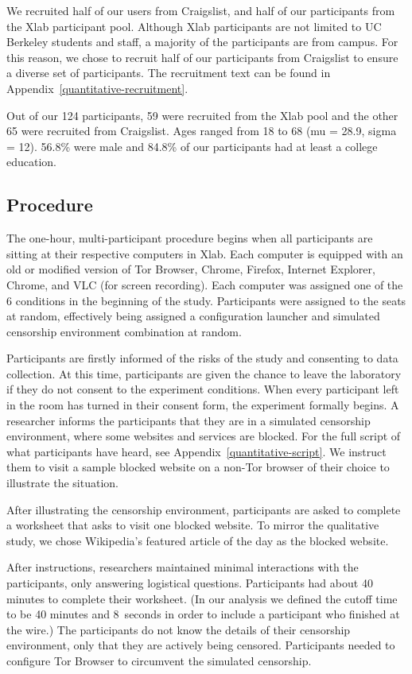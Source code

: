 \documentclass[USenglish,oneside,twocolumn]{article}
\begin{document}
We recruited half of our users from Craigslist, and half of our participants from 
the Xlab participant pool. Although Xlab participants are not limited to UC Berkeley students and staff,
a majority of the participants are from campus. For this reason, we chose to recruit 
half of our participants from Craigslist to ensure a diverse set of participants. 
The recruitment text can be found in Appendix~\ref{quantitative-recruitment}. 

Out of our 124 participants, 59 were recruited from the Xlab pool and the other 65 were
recruited from Craigslist. Ages ranged from 18 to 68
(mu = 28.9, sigma = 12). 56.8\% were male and 
84.8\% of our participants had at least a college education.

\subsection{Procedure}
The one-hour, multi-participant procedure begins when all participants are sitting at their
respective computers in Xlab. Each computer is equipped with an old or modified version
of Tor Browser, Chrome, Firefox, Internet Explorer,  Chrome, and VLC (for screen recording).
Each computer was assigned one of the 6 conditions in the beginning of the study. Participants
were assigned to the seats at random, effectively being assigned a configuration launcher and
simulated censorship environment combination at random. 

Participants are firstly informed of the risks of the study and consenting to data collection.  At
this time, participants are given the chance to leave the laboratory if they do not consent to 
the experiment conditions. When every participant left in the room has turned in their consent
form, the experiment formally begins. A researcher informs the participants that they are in a
simulated censorship environment, where some websites and services are blocked. 
For the full script of what participants have heard, see Appendix~\ref{quantitative-script}. We
instruct them to visit a sample blocked website on a non-Tor browser of their choice to illustrate 
the situation.

After illustrating the censorship environment, participants are asked to 
complete a worksheet that asks to visit one blocked website. 
To mirror the qualitative study, we chose Wikipedia's featured article of the day 
as the blocked website. 

After instructions, researchers maintained minimal interactions with the participants, 
only answering logistical questions. Participants had
about 40 minutes to complete their worksheet.
(In our analysis we defined the cutoff time to be 40 minutes and 8~seconds
in order to include a participant who finished at the wire.)
The participants do not know the details of their censorship environment,
only that they are actively being censored. Participants needed to configure Tor Browser to 
circumvent the simulated censorship. 
\end{document}
